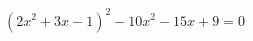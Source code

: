 \begin{ex}[type=equation]
	\begin{condition}
		\( (2x^2+3x-1)^2-10x^2-15x+9=0 \)
	\end{condition}
\end{ex}